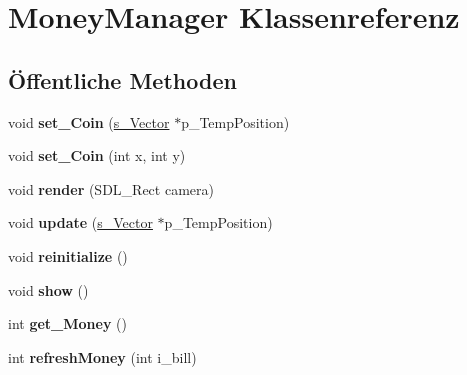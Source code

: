\hypertarget{class_money_manager}{\section{Money\-Manager Klassenreferenz}
\label{class_money_manager}
}
\subsection*{Öffentliche Methoden}
\begin{DoxyCompactItemize}
\item 
\hypertarget{class_money_manager_afb4cbbd62d99a50349450f994180a030}{void {\bfseries set\-\_\-\-Coin} (\hyperlink{structs___vector}{s\-\_\-\-Vector} $\ast$p\-\_\-\-Temp\-Position)}\label{class_money_manager_afb4cbbd62d99a50349450f994180a030}

\item 
\hypertarget{class_money_manager_af86f1a7b7224997f693dae28a2e3b025}{void {\bfseries set\-\_\-\-Coin} (int x, int y)}\label{class_money_manager_af86f1a7b7224997f693dae28a2e3b025}

\item 
\hypertarget{class_money_manager_a33ad5f3a0229855b500ccbaf791d48db}{void {\bfseries render} (S\-D\-L\-\_\-\-Rect camera)}\label{class_money_manager_a33ad5f3a0229855b500ccbaf791d48db}

\item 
\hypertarget{class_money_manager_a2732c50d4ab200fa9aa89881ddaafe9b}{void {\bfseries update} (\hyperlink{structs___vector}{s\-\_\-\-Vector} $\ast$p\-\_\-\-Temp\-Position)}\label{class_money_manager_a2732c50d4ab200fa9aa89881ddaafe9b}

\item 
\hypertarget{class_money_manager_ad48afb7b433b15f01a554884a0b2e086}{void {\bfseries reinitialize} ()}\label{class_money_manager_ad48afb7b433b15f01a554884a0b2e086}

\item 
\hypertarget{class_money_manager_acec03aacba984985299507968b60c40b}{void {\bfseries show} ()}\label{class_money_manager_acec03aacba984985299507968b60c40b}

\item 
\hypertarget{class_money_manager_a4ded1a440c3c30ab5f1ff498aa1f0caf}{int {\bfseries get\-\_\-\-Money} ()}\label{class_money_manager_a4ded1a440c3c30ab5f1ff498aa1f0caf}

\item 
\hypertarget{class_money_manager_acda99c2efae55a5c4eaf5670305d7f07}{int {\bfseries refresh\-Money} (int i\-\_\-bill)}\label{class_money_manager_acda99c2efae55a5c4eaf5670305d7f07}

\end{DoxyCompactItemize}

